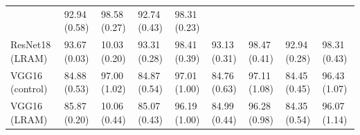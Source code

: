 \documentclass{article}
\theoremstyle{plain}
\theoremstyle{definition}
\theoremstyle{remark}
\begin{document}
\begin{table}[p]
\begin{tabularx}{\textwidth}{l *{8}{Y}}
              & 92.94 (0.58) & 98.58 (0.27)
              & 92.74 (0.43) & 98.31 (0.23) \\
ResNet18 (LRAM) & 93.67 (0.03) & 10.03 (0.20)
              & 93.31 (0.28) & 98.41 (0.39)
              & 93.13 (0.31) & 98.47 (0.41)
              & 92.94 (0.28) & 98.31 (0.43) \\
\midrule
VGG16 (control)    & 84.88 (0.53) & 97.00 (1.02)
              & 84.87 (0.54) & 97.01 (1.00)
              & 84.76 (0.63) & 97.11 (1.08)
              & 84.45 (0.45) & 96.43 (1.07) \\
VGG16 (LRAM)    & 85.87 (0.20) & 10.06 (0.44)
              & 85.07 (0.43) & 96.19 (1.00)
              & 84.99 (0.44) & 96.28 (0.98)
              & 84.35 (0.54) & 96.07 (1.14) \\
\bottomrule
\end{tabularx}

\vspace{6pt}


\end{table}
\end{document}
